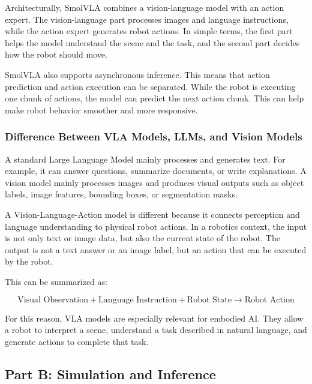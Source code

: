 \documentclass[11pt,a4paper]{article}
\begin{document}
Architecturally, SmolVLA combines a vision-language model with an action expert. The vision-language part processes images and language instructions, while the action expert generates robot actions. In simple terms, the first part helps the model understand the scene and the task, and the second part decides how the robot should move.

SmolVLA also supports asynchronous inference. This means that action prediction and action execution can be separated. While the robot is executing one chunk of actions, the model can predict the next action chunk. This can help make robot behavior smoother and more responsive.

\subsubsection{Difference Between VLA Models, LLMs, and Vision Models}

A standard Large Language Model mainly processes and generates text. For example, it can answer questions, summarize documents, or write explanations. A vision model mainly processes images and produces visual outputs such as object labels, image features, bounding boxes, or segmentation masks.

A Vision-Language-Action model is different because it connects perception and language understanding to physical robot actions. In a robotics context, the input is not only text or image data, but also the current state of the robot. The output is not a text answer or an image label, but an action that can be executed by the robot.

This can be summarized as:

\[
\text{Visual Observation} + \text{Language Instruction} + \text{Robot State}
\rightarrow
\text{Robot Action}
\]

For this reason, VLA models are especially relevant for embodied AI. They allow a robot to interpret a scene, understand a task described in natural language, and generate actions to complete that task.

\subsection{Part B: Simulation and Inference}
\end{document}
